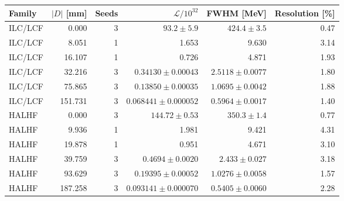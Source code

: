 \begin{tabular}{@{}lrrrrr@{}}
\toprule
Family & $|D|$ [mm] & Seeds & $\mathcal L/10^{32}$ & FWHM [MeV] & Resolution [\%]\\
\midrule
ILC/LCF & 0.000 & 3 & $93.2\pm5.9$ & $424.4\pm3.5$ & 0.47\\
ILC/LCF & 8.051 & 1 & 1.653 & 9.630 & 3.14\\
ILC/LCF & 16.107 & 1 & 0.726 & 4.871 & 1.93\\
ILC/LCF & 32.216 & 3 & $0.34130\pm0.00043$ & $2.5118\pm0.0077$ & 1.80\\
ILC/LCF & 75.865 & 3 & $0.13850\pm0.00035$ & $1.0695\pm0.0042$ & 1.88\\
ILC/LCF & 151.731 & 3 & $0.068441\pm0.000052$ & $0.5964\pm0.0017$ & 1.40\\
HALHF & 0.000 & 3 & $144.72\pm0.53$ & $350.3\pm1.4$ & 0.77\\
HALHF & 9.936 & 1 & 1.981 & 9.421 & 4.31\\
HALHF & 19.878 & 1 & 0.951 & 4.671 & 3.10\\
HALHF & 39.759 & 3 & $0.4694\pm0.0020$ & $2.433\pm0.027$ & 3.18\\
HALHF & 93.629 & 3 & $0.19395\pm0.00052$ & $1.0276\pm0.0058$ & 1.57\\
HALHF & 187.258 & 3 & $0.093141\pm0.000070$ & $0.5405\pm0.0060$ & 2.28\\
\bottomrule
\end{tabular}
